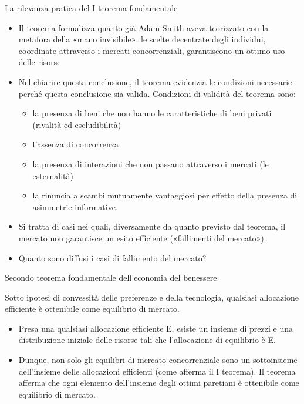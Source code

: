 \documentclass[aspectratio=149,11pt]{beamer}
\begin{document}
\begin{frame}{La rilevanza pratica del I teorema fondamentale}
\begin{itemize}
\item Il teorema formalizza quanto già Adam Smith aveva teorizzato con la metafora
della «mano invisibile»: le scelte decentrate degli individui, coordinate
attraverso i mercati concorrenziali, garantiscono un ottimo uso delle
risorse
\item Nel chiarire questa conclusione, il teorema evidenzia le condizioni
necessarie perché questa conclusione sia valida. Condizioni di validità del
teorema sono:
\begin{itemize}
\item la presenza di beni che non hanno le caratteristiche di beni privati
(rivalità ed escludibilità)
\item l’assenza di \alert{concorrenza}
\item la presenza di interazioni che non passano attraverso i mercati (le
\alert{esternalità})
\item la rinuncia a scambi mutuamente vantaggiosi per effetto della presenza di
\alert{asimmetrie informative}.
\end{itemize}
\item Si tratta di casi nei quali, diversamente da quanto previsto dal teorema, il
mercato non garantisce un esito efficiente («fallimenti del mercato»).
\item Quanto sono diffusi i casi di fallimento del mercato?
\end{itemize}
\end{frame}

\begin{frame}{Secondo teorema fondamentale dell'economia del benessere}
\begin{block}{}
Sotto ipotesi di convessità delle preferenze e della tecnologia, qualsiasi allocazione efficiente è ottenibile come equilibrio di mercato. 
\end{block}
\begin{itemize}
\item Presa una qualsiasi allocazione efficiente E, esiste un insieme di prezzi e
una distribuzione iniziale delle risorse tali che l’allocazione di
equilibrio è E.
\item Dunque, non solo gli equilibri di mercato concorrenziale sono un
sottoinsieme dell’insieme delle allocazioni efficienti (come afferma il I
teorema). Il teorema afferma che ogni elemento dell’insieme degli
ottimi paretiani è ottenibile come equilibrio di mercato.
\end{itemize}
\end{frame}
\end{document}
